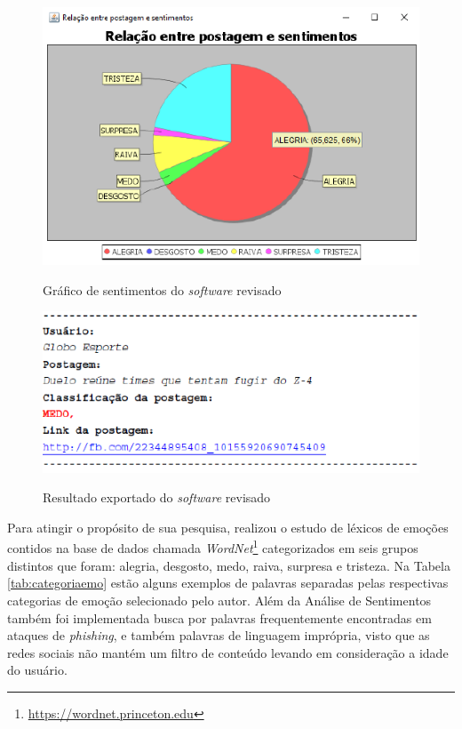 \begin{figure}[!h]
\centering 
\caption{Gráfico de sentimentos do \textit{software} revisado}
\includegraphics[scale=0.8]{imagens/graficodesentimentosfilipe.png}
\label{fig:graficotccfilipe}
\end{figure}

\begin{figure}[!h]
\centering 
\caption{Resultado exportado do \textit{software} revisado}
\includegraphics[scale=0.8]{imagens/exportadofilipe.png}
\label{fig:exportadotccfilipe}
\end{figure}

\newpage
Para atingir o propósito de sua pesquisa,  realizou o estudo de léxicos de emoções contidos na base de dados chamada \textit{WordNet}\footnote{\url{https://wordnet.princeton.edu}} categorizados em seis grupos distintos que foram: alegria, desgosto, medo, raiva, surpresa e tristeza. Na Tabela \ref{tab:categoriaemo} estão alguns exemplos de palavras separadas pelas respectivas categorias de emoção selecionado pelo autor. Além da Análise de Sentimentos também foi implementada busca por palavras frequentemente encontradas em ataques de \textit{phishing},  e também palavras de linguagem imprópria, visto que as redes sociais não mantém um filtro de conteúdo levando em consideração a idade do usuário.

